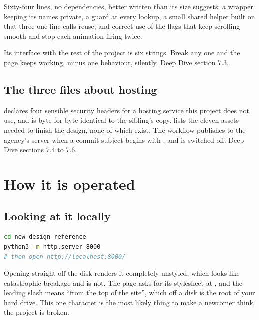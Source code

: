 \documentclass[11pt,a4paper]{article}
\begin{document}
Sixty-four lines, no dependencies, better written than its size suggests: a wrapper
keeping its names private, a guard at every lookup, a small shared helper built on
 that three one-line calls reuse, and correct use of the
flags that keep scrolling smooth and stop each animation firing twice.

Its interface with the rest of the project is six strings. Break any one and the
page keeps working, minus one behaviour, silently. Deep Dive section 7.3.

\subsection{The three files about hosting}

 declares four sensible security headers for a hosting service
this project does not use, and is byte for byte identical to the sibling's copy.
 lists the eleven assets needed to finish the design, none of which
exist. The workflow publishes to the agency's server when a commit subject begins
with \code{[deploy]}, and is switched off. Deep Dive sections 7.4 to 7.6.

\section{How it is operated}

\subsection{Looking at it locally}

\begin{lstlisting}[language=bash,caption={Serve it, do not open the file directly}]
cd new-design-reference
python3 -m http.server 8000
# then open http://localhost:8000/
\end{lstlisting}

Opening  straight off the disk renders it completely unstyled,
which looks like catastrophic breakage and is not. The page asks for its stylesheet
at , and the leading slash means ``from the top of the site'',
which off a disk is the root of your hard drive. This one character is the most
likely thing to make a newcomer think the project is broken.
\end{document}
